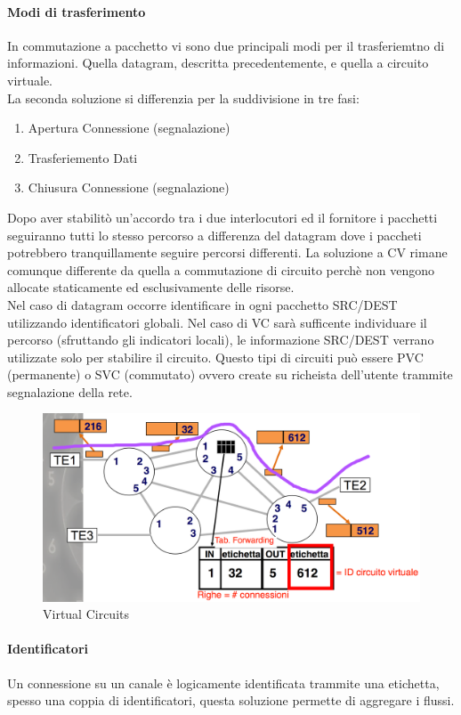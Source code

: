 \documentclass[12pt]{article}
\begin{document}
\paragraph{Modi di trasferimento}
In commutazione a pacchetto vi sono due principali modi per il trasferiemtno di informazioni. Quella datagram, descritta precedentemente, e quella a circuito virtuale.\\
La seconda soluzione si differenzia per la suddivisione in tre fasi:
\begin{enumerate}
  \item Apertura Connessione (segnalazione)
  \item Trasferiemento Dati
  \item Chiusura Connessione (segnalazione)
\end{enumerate}
Dopo aver stabilitò un'accordo tra i due interlocutori ed il fornitore i pacchetti seguiranno tutti lo stesso percorso a differenza del datagram dove i paccheti potrebbero tranquillamente seguire percorsi differenti. La soluzione a CV rimane comunque differente da quella a commutazione di circuito perchè non vengono allocate staticamente ed esclusivamente delle risorse.\\
Nel caso di datagram occorre identificare in ogni pacchetto SRC/DEST utilizzando identificatori globali. Nel caso di VC sarà sufficente individuare il percorso (sfruttando gli indicatori locali), le informazione SRC/DEST verrano utilizzate solo per stabilire il circuito. Questo tipi di circuiti può essere PVC (permanente) o SVC (commutato) ovvero create su richeista dell'utente trammite segnalazione della rete.
\begin{figure}[h!]
  \includegraphics[width=\linewidth]{images/vc.png}
  \caption{Virtual Circuits}
  \label{fig:vc}
\end{figure} %
\paragraph{Identificatori}
Un connessione su un canale è logicamente identificata trammite una etichetta, spesso una coppia di identificatori, questa soluzione permette di aggregare i flussi.\\
\end{document}

